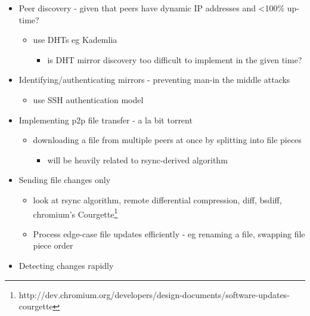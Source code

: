 \documentclass[12pt,a4paper,]{adreport}
\begin{document}
\begin{itemize}
\itemsep1pt\parskip0pt
\item
  Peer discovery - given that peers have dynamic IP addresses and
  \textless{}100\% up-time?

  \begin{itemize}
  \itemsep1pt\parskip0pt
  \item
    use DHTs eg Kademlia

    \begin{itemize}
    \itemsep1pt\parskip0pt
    \item
      is DHT mirror discovery too difficult to implement in the given
      time?
    \end{itemize}
  \end{itemize}
\item
  Identifying/authenticating mirrors - preventing man-in the middle
  attacks

  \begin{itemize}
  \itemsep1pt\parskip0pt
  \item
    use SSH authentication model
  \end{itemize}
\item
  Implementing p2p file transfer - a la bit torrent

  \begin{itemize}
  \itemsep1pt\parskip0pt
  \item
    downloading a file from multiple peers at once by splitting into
    file pieces

    \begin{itemize}
    \itemsep1pt\parskip0pt
    \item
      will be heavily related to rsync-derived algorithm
    \end{itemize}
  \end{itemize}
\item
  Sending file changes only

  \begin{itemize}
  \itemsep1pt\parskip0pt
  \item
    look at rsync algorithm, remote differential compression, diff,
    bsdiff, chromium's Courgette\footnote{http://dev.chromium.org/developers/design-documents/software-updates-courgette}
  \item
    Process edge-case file updates efficiently - eg renaming a file,
    swapping file piece order
  \end{itemize}
\item
  Detecting changes rapidly


\end{itemize}
\end{document}
